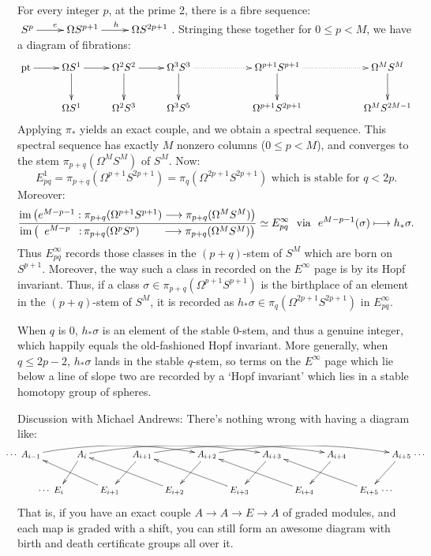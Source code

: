 \documentclass[11pt]{article}
\begin{document}
\begin{discussion of EHP SS}
For every integer $p$, at the prime 2, there is a fibre sequence: $\xymatrix{S^p\ar[r]^e&\Omega S^{p+1}\ar[r]^h& \Omega S^{2p+1}}$. Stringing these together for $0\leq p<M$, we have a diagram of fibrations:
\[\xymatrix{
\textup{pt}\ar[r]&\Omega S^1\ar[d]\ar[r]&\Omega^2 S^2\ar[d]\ar[r]&\Omega^3 S^3\ar[d]\ar@{.>}[rr]&&\Omega^{p+1}S^{p+1}\ar[d]\ar@{.>}[rr]&&\Omega^{M}S^{M}\ar[d]\\
&\Omega S^1&\Omega^2 S^3& \Omega^3S^5&&\Omega^{p+1} S^{2p+1}&&\Omega^{M}S^{2M-1}
}\]
Applying $\pi_*$ yields an exact couple, and we obtain a spectral sequence. This spectral sequence has exactly $M$ nonzero columns ($0\leq p <M$), and converges to the stem $\pi_{p+q}(\Omega^{M}S^{M})$ of $S^{M}$. Now:
\[E_{pq}^1=\pi_{p+q}(\Omega^{p+1}S^{2p+1})=\pi_q (\Omega^{2p+1}S^{2p+1})\text{ which is stable for $q< 2p$}.\]
Moreover:
\[
\frac{\im\left(e^{M-p-1}:\pi_{p+q}(\Omega^{p+1}S^{p+1})\to\pi_{p+q}(\Omega^MS^M)\right)}
{\im\left(\phantom{e^{M-p-1}:}\makebox[0cm][r]{$e^{M-p}\,\ :$}
\,\makebox[0cm][l]{$\pi_{p+q}(\Omega^{p}S^{p})$}\phantom{\pi_{p+q}(\Omega^{p+1}S^{p+1})}
\to\pi_{p+q}(\Omega^MS^M)\right)}\simeq E_{pq}^\infty\text{\ \ via \ }e^{M-p-1}(\sigma)\mapsto h_*\sigma.\]%
Thus $E^\infty_{pq}$ records those classes in the $(p+q)$-stem of $S^M$ which are born on $S^{p+1}$. Moreover, the way such a class in recorded on the $E^\infty$ page is by its Hopf invariant. Thus, if a class $\sigma\in\pi_{p+q}(\Omega^{p+1}S^{p+1})$ is the birthplace of an element in the $(p+q)$-stem of $S^M$, it is recorded as $h_*\sigma\in\pi_q({\Omega^{2p+1}S^{2p+1}})$ in $E^\infty_{pq}$.

When $q$ is $0$, $h_*\sigma$ is an element of the stable $0$-stem, and thus a genuine integer, which happily equals the old-fashioned Hopf invariant. More generally, when $q\leq 2p-2$, $h_*\sigma$ lands in the stable $q$-stem, so terms on the $E^\infty$ page which lie below a line of slope two are recorded by a `Hopf invariant' which lies in a stable homotopy group of spheres.

{\color{red}Discussion with Michael Andrews:}
There's nothing wrong with having a diagram like:
\[\xymatrix@C=.3cm{
\makebox[0cm][r]{$\cdots$\ }
A_{i-1}\ar@/^1em/[rrrrrr]&&
A_{i  }\ar@/^1em/[rrrrrr]\ar[dl]&&
A_{i+1}\ar@/^1em/[rrrrrr]\ar[ld]&&
A_{i+2}\ar@/^1em/[rrrrrr]\ar[ld]&&
A_{i+3}\ar[ld]&&
A_{i+4}\ar[ld]&&
A_{i+5}\ar[dl]\makebox[0cm][l]{\ $\cdots$}\\
&
\makebox[0cm][r]{$\cdots$\ }
E_{i  }&&
E_{i+1}\ar[lllu]&&
E_{i+2}\ar[lllu]&&
E_{i+3}\ar[lllu]&&
E_{i+4}\ar[lllu]&&
E_{i+5}\ar[lllu]\makebox[0cm][l]{\ $\cdots$}
}\]
That is, if you have an exact couple $A\to A\to E\to A$ of graded modules, and
each map is graded with a shift, you can still form an awesome diagram with
birth and death certificate groups all over it.


\end{discussion of EHP SS}
\end{document}
